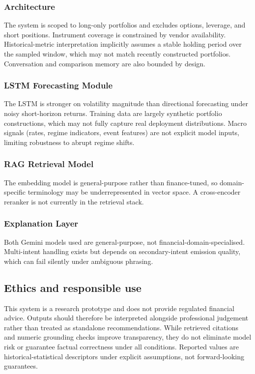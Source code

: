 \subsubsection{Architecture}
The system is scoped to long-only portfolios and excludes options, leverage, and short positions. Instrument coverage is constrained by vendor availability. Historical-metric interpretation implicitly assumes a stable holding period over the sampled window, which may not match recently constructed portfolios. Conversation and comparison memory are also bounded by design.

\subsubsection{LSTM Forecasting Module}
The LSTM is stronger on volatility magnitude than directional forecasting under noisy short-horizon returns. Training data are largely synthetic portfolio constructions, which may not fully capture real deployment distributions. Macro signals (rates, regime indicators, event features) are not explicit model inputs, limiting robustness to abrupt regime shifts.

\subsubsection{RAG Retrieval Model}
The embedding model is general-purpose rather than finance-tuned, so domain-specific terminology may be underrepresented in vector space. A cross-encoder reranker is not currently in the retrieval stack.


\subsubsection{Explanation Layer}
Both Gemini models used are general-purpose, not financial-domain-specialised. Multi-intent handling exists but depends on secondary-intent emission quality, which can fail silently under ambiguous phrasing.


\subsection{Ethics and responsible use}
This system is a research prototype and does not provide regulated financial advice. Outputs should therefore be interpreted alongside professional judgement rather than treated as standalone recommendations. While retrieved citations and numeric grounding checks improve transparency, they do not eliminate model risk or guarantee factual correctness under all conditions. Reported values are historical-statistical descriptors under explicit assumptions, not forward-looking guarantees.
